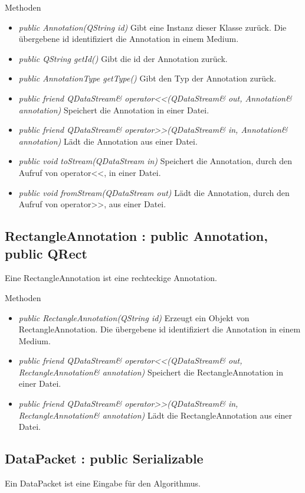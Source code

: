 Methoden
\begin{itemize}
\item \textit{public Annotation(QString id)} Gibt eine Instanz dieser Klasse zurück. Die übergebene id identifiziert die Annotation in einem Medium.
\item \textit{public QString getId()} Gibt die id der Annotation zurück.
\item \textit{public AnnotationType getType()} Gibt den Typ der Annotation zurück.
\item \textit{public friend QDataStream\& operator<<(QDataStream\& out, Annotation\& annotation)} Speichert die Annotation in einer Datei.
\item \textit{public friend QDataStream\& operator>>(QDataStream\& in, Annotation\& annotation)} Lädt die Annotation aus einer Datei.
\item \textit{public void toStream(QDataStream in)} Speichert die Annotation, durch den Aufruf von operator<<, in einer Datei.
\item \textit{public void fromStream(QDataStream out)} Lädt die Annotation, durch den Aufruf von operator>>, aus einer Datei.
\end{itemize}

\subsection*{RectangleAnnotation : public Annotation, public QRect}
Eine RectangleAnnotation ist eine rechteckige Annotation.

Methoden
\begin{itemize}
\item \textit{public RectangleAnnotation(QString id)} Erzeugt ein Objekt von RectangleAnnotation. Die übergebene id identifiziert die Annotation in einem Medium.
\item \textit{public friend QDataStream\& operator<<(QDataStream\& out, RectangleAnnotation\& annotation)} Speichert die RectangleAnnotation in einer Datei.
\item \textit{public friend QDataStream\& operator>>(QDataStream\& in, RectangleAnnotation\& annotation)} Lädt die RectangleAnnotation aus einer Datei.
\end{itemize}

\subsection*{DataPacket : public Serializable}
Ein DataPacket ist eine Eingabe für den Algorithmus.

